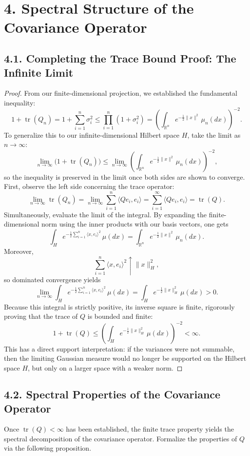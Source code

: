 \documentclass[11pt]{article}
\theoremstyle{definition}
\theoremstyle{remark}
\DeclareMathOperator{\tr}{tr}
\begin{document}
\section*{4. Spectral Structure of the Covariance Operator}

\subsection*{4.1. Completing the Trace Bound Proof: The Infinite Limit}
\begin{proof}
From our finite-dimensional projection, we established the fundamental inequality:
\[
1+\tr(Q_n)
=
1+\sum_{i=1}^n \sigma_i^2
\le
\prod_{i=1}^n (1+\sigma_i^2)
=
\left(\int_{\mathbb R^n} e^{-\frac{1}{2}\|x\|^2}\,\mu_n(dx)\right)^{-2}.
\]
To generalize this to our infinite-dimensional Hilbert space $H$, take the limit as \(n\to\infty\):
\[
\lim_{n\to\infty}\bigl(1+\tr(Q_n)\bigr)
\le
\lim_{n\to\infty}\left(\int_{\mathbb R^n} e^{-\frac{1}{2}\|x\|^2}\,\mu_n(dx)\right)^{-2},
\]
so the inequality is preserved in the limit once both sides are shown to converge.
First, observe the left side concerning the trace operator:
\[
\lim_{n\to\infty}\tr(Q_n)
=
\lim_{n\to\infty}\sum_{i=1}^n \langle Qe_i,e_i\rangle
=
\sum_{i=1}^\infty \langle Qe_i,e_i\rangle
=
\tr(Q).
\]
Simultaneously, evaluate the limit of the integral. By expanding the finite-dimensional norm using the inner products with our basis vectors, one gets
\[
\int_H e^{-\frac{1}{2}\sum_{i=1}^n \langle x,e_i\rangle^2}\,\mu(dx)
=
\int_{\mathbb R^n} e^{-\frac{1}{2}\|x\|^2}\,\mu_n(dx).
\]
Moreover,
\[
\sum_{i=1}^n \langle x,e_i\rangle^2 \uparrow \|x\|_H^2,
\]
so dominated convergence yields
\[
\lim_{n\to\infty}\int_H e^{-\frac{1}{2}\sum_{i=1}^n \langle x,e_i\rangle^2}\,\mu(dx)
=
\int_H e^{-\frac{1}{2}\|x\|_H^2}\,\mu(dx)>0.
\]
Because this integral is strictly positive, its inverse square is finite, rigorously proving that the trace of $Q$ is bounded and finite:
\[
1+\tr(Q)\le \left(\int_H e^{-\frac{1}{2}\|x\|_H^2}\,\mu(dx)\right)^{-2}<\infty.
\]
This has a direct support interpretation: if the variances were not summable, then the limiting Gaussian measure would no longer be supported on the Hilbert space \(H\), but only on a larger space with a weaker norm.
\end{proof}

\subsection*{4.2. Spectral Properties of the Covariance Operator}
Once \(\tr(Q)<\infty\) has been established, the finite trace property yields the spectral decomposition of the covariance operator. Formalize the properties of $Q$ via the following proposition.
\end{document}
